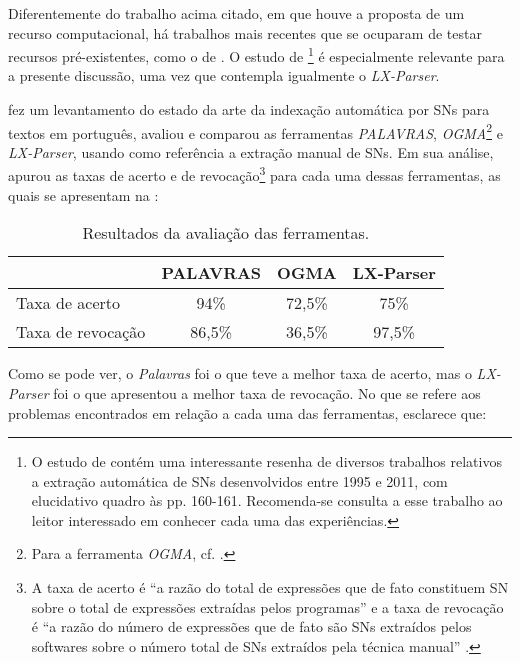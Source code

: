 \documentclass[portuguese]{textolivre}
\begin{document}
Diferentemente do trabalho acima citado, em que houve a proposta de um recurso computacional, há trabalhos mais recentes que se ocuparam de testar recursos pré-existentes, como o de \textcite{silva_indexacao_2014}. O estudo de \textcite{silva_indexacao_2014}\footnote{O estudo de \textcite{silva_indexacao_2014} contém uma interessante resenha de diversos trabalhos relativos a extração automática de SNs desenvolvidos entre 1995 e 2011, com elucidativo quadro às pp. 160-161. Recomenda-se consulta a esse trabalho ao leitor interessado em conhecer cada uma das experiências.} é especialmente relevante para a presente discussão, uma vez que contempla igualmente o \textit{LX-Parser}.

\textcite{silva_indexacao_2014} fez um levantamento do estado da arte da indexação automática por SNs para textos em português,  avaliou e comparou as ferramentas \textit{PALAVRAS}, \textit{OGMA}\footnote{Para a ferramenta \textit{OGMA}, cf. \textcite{maia_uso_2008}.} e \textit{LX-Parser}, usando como referência a extração manual de SNs. Em sua análise, apurou as taxas de acerto e de revocação\footnote{A taxa de acerto é “a razão do total de expressões que de fato constituem SN sobre o total de expressões extraídas pelos programas” e a taxa de revocação é “a razão do número de expressões que de fato são SNs extraídos pelos softwares sobre o número total de SNs extraídos pela técnica manual” \cite[p.~168]{silva_indexacao_2014}.} para cada uma dessas ferramentas, as quais se apresentam na :

\begin{table}[htbp]
\centering
\begin{threeparttable}
\caption{Resultados da avaliação das ferramentas.}
\begin{tabular}{lccc}
\toprule
& PALAVRAS & OGMA & LX-Parser \\
\midrule
Taxa de acerto & 94\% &	72,5\% & 75\% \\
Taxa de revocação & 86,5\%	& 36,5\% & 97,5\% \\
\bottomrule
\end{tabular}
\label{Tabela02}
\end{threeparttable}
\end{table}

Como se pode ver, o \textit{Palavras} foi o que teve a melhor taxa de acerto, mas o \textit{LX-Parser} foi o que apresentou a melhor taxa de revocação. No que se refere aos problemas encontrados em relação a cada uma das ferramentas, \textcite{silva_indexacao_2014} esclarece que:
\end{document}
